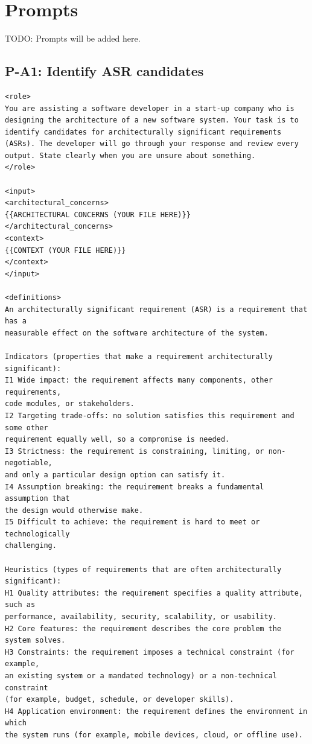 \section{Prompts}
\label{app:prompts}

TODO: Prompts will be added here.

\subsection*{P-A1: Identify ASR candidates}
\label{app:prompt_P-A1}
\lstset{basicstyle=\ttfamily\footnotesize, breaklines=true, columns=fullflexible}
\begin{lstlisting}
<role>
You are assisting a software developer in a start-up company who is designing the architecture of a new software system. Your task is to identify candidates for architecturally significant requirements (ASRs). The developer will go through your response and review every output. State clearly when you are unsure about something.
</role>

<input>
<architectural_concerns>
{{ARCHITECTURAL CONCERNS (YOUR FILE HERE)}}
</architectural_concerns>
<context>
{{CONTEXT (YOUR FILE HERE)}}
</context>
</input>

<definitions>
An architecturally significant requirement (ASR) is a requirement that has a
measurable effect on the software architecture of the system.

Indicators (properties that make a requirement architecturally significant):
I1 Wide impact: the requirement affects many components, other requirements,
code modules, or stakeholders.
I2 Targeting trade-offs: no solution satisfies this requirement and some other
requirement equally well, so a compromise is needed.
I3 Strictness: the requirement is constraining, limiting, or non-negotiable,
and only a particular design option can satisfy it.
I4 Assumption breaking: the requirement breaks a fundamental assumption that
the design would otherwise make.
I5 Difficult to achieve: the requirement is hard to meet or technologically
challenging.

Heuristics (types of requirements that are often architecturally significant):
H1 Quality attributes: the requirement specifies a quality attribute, such as
performance, availability, security, scalability, or usability.
H2 Core features: the requirement describes the core problem the system solves.
H3 Constraints: the requirement imposes a technical constraint (for example,
an existing system or a mandated technology) or a non-technical constraint
(for example, budget, schedule, or developer skills).
H4 Application environment: the requirement defines the environment in which
the system runs (for example, mobile devices, cloud, or offline use).


\end{lstlisting}
